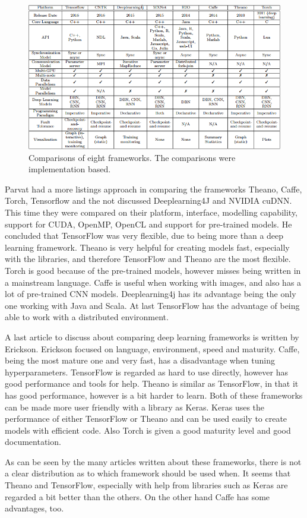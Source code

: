 \documentclass[10pt,a4paper]{article}
\begin{document}
	\begin{figure}[h!]
		\includegraphics[scale=0.8]{FrameworkComparisons.PNG}
		\caption{Comparisons of eight frameworks. The comparisons were 
		implementation based.}
		\label{fig:FramewComps}
	\end{figure}
	
	Parvat had a more listings approach in comparing the frameworks Theano, 
	Caffe, Torch, Tensorflow and the not discussed Deeplearning4J and NVIDIA 
	cuDNN. This time they were compared on their platform, interface, modelling 
	capability, support for CUDA, OpenMP, OpenCL and support for pre-trained 
	models. He concluded that TensorFlow was very flexible, due to being more 
	than a deep learning framework. Theano is very helpful for creating models 
	fast, especially with the libraries, and therefore TensorFlow and Theano 
	are the most flexible. Torch is good because of the pre-trained models, 
	however misses being written in a mainstream language. Caffe is useful when 
	working with images, and also has a lot of pre-trained CNN models. 
	Deeplearning4j has its advantage being the only one working with Java and 
	Scala. 
	At last TensorFlow has the advantage of being able to work with a 
	distributed environment. \cite{parvat2017survey}
	
	 A last article to discuss about comparing deep learning frameworks is 
	 written by Erickson. Erickson focused on language, environment, speed and 
	 maturity. Caffe, being the most mature one and very fast, has a 
	 disadvantage when tuning hyperparameters. TensorFlow is regarded as hard 
	 to use directly, however has good performance and tools for help. Theano 
	 is similar as TensorFlow, in that it has good performance, however is a 
	 bit harder to learn. Both of these frameworks can be made more user 
	 friendly with a library as Keras. Keras uses the performance of either 
	 TensorFlow or Theano and can be used easily to create models with 
	 efficient code. Also Torch is given a good maturity level and good 
	 documentation. \cite{erickson2017toolkits}
	
	As can be seen by the many articles written about these frameworks, there 
	is not a clear distribution as to which framework should be used when. It 
	seems that Theano and TensorFlow, especially with help from libraries such 
	as Keras are regarded a bit better than the others. On the other hand Caffe 
	has some advantages, too.
	
	 
	
	
\end{document}

